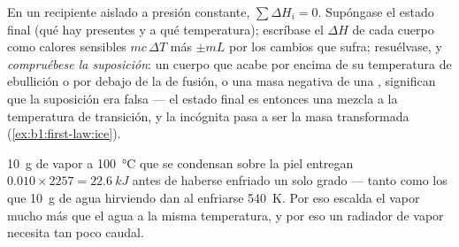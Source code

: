 \begin{method}\label{meth:b1:phase-changes:calorimetry}
En un recipiente aislado a presión constante, $\sum\Delta H_i = 0$.
Supóngase el estado final (qué  hay presentes y a qué temperatura);
escríbase el $\Delta H$ de cada cuerpo como calores sensibles $mc\,\Delta T$
más  $\pm mL$ por los cambios que sufra; resuélvase, y
\emph{compruébese la suposición}: un cuerpo que acabe por encima de su
temperatura de ebullición o por debajo de la de fusión, o una masa
negativa de una , significan que la suposición era falsa --- el
estado final es entonces una mezcla a la temperatura de transición, y la
incógnita pasa a ser la masa transformada (\cref{ex:b1:first-law:ice}).
\end{method}

\begin{example}\label{ex:b1:phase-changes:steam}
\qty{10}{g} de vapor a \qty{100}{\degreeCelsius} que se condensan sobre la
piel entregan $0.010 \times 2257 = \qty{22.6}{kJ}$ antes de haberse enfriado
un solo grado --- tanto como los que \qty{10}{g} de agua hirviendo dan al
enfriarse \qty{540}{K}. Por eso escalda el vapor mucho más que el agua a
la misma temperatura, y por eso un radiador de vapor necesita tan poco caudal.
\end{example}

